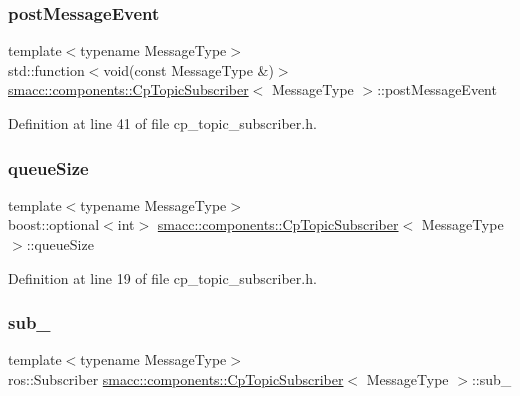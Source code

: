 \subsubsection{\texorpdfstring{post\+Message\+Event}{postMessageEvent}}
{\footnotesize\ttfamily template$<$typename Message\+Type$>$ \\
std\+::function$<$void(const Message\+Type \&)$>$ \hyperlink{classsmacc_1_1components_1_1CpTopicSubscriber}{smacc\+::components\+::\+Cp\+Topic\+Subscriber}$<$ Message\+Type $>$\+::post\+Message\+Event}



Definition at line 41 of file cp\+\_\+topic\+\_\+subscriber.\+h.

\mbox{\label{classsmacc_1_1components_1_1CpTopicSubscriber_ad8775c1e5773a2c58d63ad2d64d28580}} 
\subsubsection{\texorpdfstring{queue\+Size}{queueSize}}
{\footnotesize\ttfamily template$<$typename Message\+Type$>$ \\
boost\+::optional$<$int$>$ \hyperlink{classsmacc_1_1components_1_1CpTopicSubscriber}{smacc\+::components\+::\+Cp\+Topic\+Subscriber}$<$ Message\+Type $>$\+::queue\+Size}



Definition at line 19 of file cp\+\_\+topic\+\_\+subscriber.\+h.

\mbox{\label{classsmacc_1_1components_1_1CpTopicSubscriber_a87f9c87f6b7c0801dff4fcc7519dbe0e}} 
\subsubsection{\texorpdfstring{sub\+\_\+}{sub\_}}
{\footnotesize\ttfamily template$<$typename Message\+Type$>$ \\
ros\+::\+Subscriber \hyperlink{classsmacc_1_1components_1_1CpTopicSubscriber}{smacc\+::components\+::\+Cp\+Topic\+Subscriber}$<$ Message\+Type $>$\+::sub\+\_\+\hspace{0.3cm}{\ttfamily [private]}}



